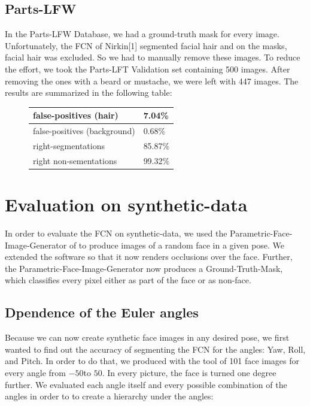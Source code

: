 \newpage

\subsection{Parts-LFW}
In the Parts-LFW Database, we had a ground-truth mask for every image. Unfortunately, the FCN of Nirkin[1] segmented facial hair and on the masks, facial hair was excluded. So we had to manually remove these images. To reduce the effort, we took the Parts-LFT Validation set containing 500 images. After removing the ones with a beard or mustache, we were left with 447 images. The results are summarized in the following table:\\
\begin{figure}
\begin{center}
\begin{tabular}{l|l} \hline
	false-positives (hair) & 7.04\%\\ \hline
	false-positives (background) & 0.68\%\\ \hline
	right-segmentations & 85.87\%\\ \hline
	right non-sementations & 99.32\% \\ \hline
\end{tabular}
\end{center}
\caption{\todo} 
\label{fig:Parts-LFW}
\end{figure}

\section{Evaluation on synthetic-data}
In order to evaluate the FCN on synthetic-data, we used the Parametric-Face-Image-Generator of \cite{parametric} to produce images of a random face in a given pose. We extended the software so that it now renders occlusions over the face. Further, the Parametric-Face-Image-Generator now produces a Ground-Truth-Mask, which classifies every pixel either as part of the face or as non-face.

\subsection{Dpendence of the Euler angles}
Because we can now create synthetic face images in any desired pose, we first wanted to find out the accuracy of segmenting the FCN for the angles: Yaw, Roll, and Pitch. In order to do that, we produced with the tool of \cite{parametric} 101 face images for every angle from $-50$\textdegree to $50$\textdegree. In every picture, the face is turned one degree further. We evaluated each angle itself and every possible combination of the angles in order to to create a hierarchy under the angles:

